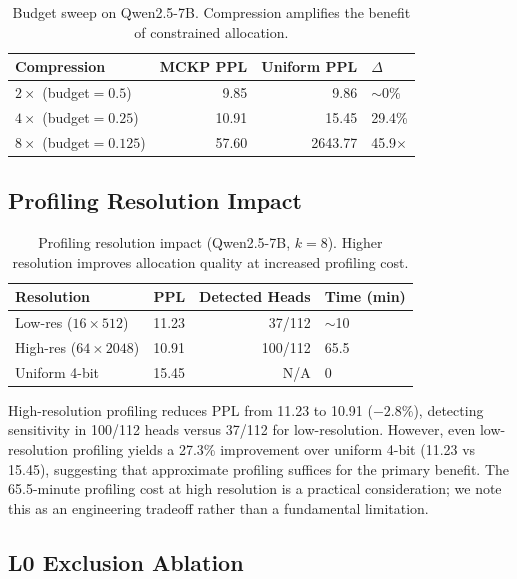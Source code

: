 \documentclass[11pt,a4paper]{article}
\begin{document}
\begin{table}[h]
\centering
\caption{Budget sweep on Qwen2.5-7B. Compression amplifies the benefit of constrained allocation.}
\label{tab:budget_sweep}
\begin{tabular}{@{}lrrl@{}}
\toprule
Compression & MCKP PPL & Uniform PPL & $\Delta$ \\
\midrule
$2\times$ (budget$=0.5$) & 9.85 & 9.86 & $\sim 0\%$ \\
$4\times$ (budget$=0.25$) & 10.91 & 15.45 & 29.4\% \\
$8\times$ (budget$=0.125$) & 57.60 & 2643.77 & 45.9$\times$ \\
\bottomrule
\end{tabular}
\end{table}

\subsection{Profiling Resolution Impact}

\begin{table}[h]
\centering
\caption{Profiling resolution impact (Qwen2.5-7B, $k{=}8$). Higher resolution improves allocation quality at increased profiling cost.}
\label{tab:profiling_resolution}
\begin{tabular}{@{}lrrl@{}}
\toprule
Resolution & PPL & Detected Heads & Time (min) \\
\midrule
Low-res ($16 \times 512$)  & 11.23 & 37/112  & $\sim$10 \\
High-res ($64 \times 2048$) & 10.91 & 100/112 & 65.5 \\
Uniform 4-bit & 15.45 & N/A & 0 \\
\bottomrule
\end{tabular}
\end{table}

High-resolution profiling reduces PPL from 11.23 to 10.91 ($-2.8\%$), detecting sensitivity in 100/112 heads versus 37/112 for low-resolution.
However, even low-resolution profiling yields a 27.3\% improvement over uniform 4-bit (11.23 vs 15.45), suggesting that approximate profiling suffices for the primary benefit.
The 65.5-minute profiling cost at high resolution is a practical consideration; we note this as an engineering tradeoff rather than a fundamental limitation.

\subsection{L0 Exclusion Ablation}
\end{document}
